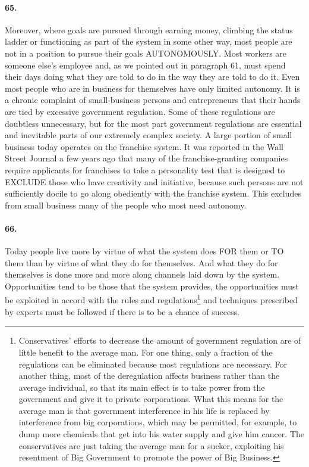 \documentclass[12pt]{book}
\begin{document}
\paragraph{65.} Moreover, where goals are pursued through earning money, climbing the status ladder or functioning as part of the system in some other way, most people are not in a position to pursue their goals AUTONOMOUSLY. Most workers are someone else's employee and, as we pointed out in paragraph 61, must spend their days doing what they are told to do in the way they are told to do it. Even most people who are in business for themselves have only limited autonomy. It is a chronic complaint of small-business persons and entrepreneurs that their hands are tied by excessive government regulation. Some of these regulations are doubtless unnecessary, but for the most part government regulations are essential and inevitable parts of our extremely complex society. A large portion of small business today operates on the franchise system. It was reported in the Wall Street Journal a few years ago that many of the franchise-granting companies require applicants for franchises to take a personality test that is designed to EXCLUDE those who have creativity and initiative, because such persons are not sufficiently docile to go along obediently with the franchise system. This excludes from small business many of the people who most need autonomy.


\paragraph{66.} Today people live more by virtue of what the system does FOR them or TO them than by virtue of what they do for themselves. And what they do for themselves is done more and more along channels laid down by the system. Opportunities tend to be those that the system provides, the opportunities must be exploited in accord with the rules and regulations\footnote{Conservatives' efforts to decrease the amount of government regulation are of little benefit to the average man. For one thing, only a fraction of the regulations can be eliminated because most regulations are necessary. For another thing, most of the deregulation affects business rather than the average individual, so that its main effect is to take power from the government and give it to private corporations. What this means for the average man is that government interference in his life is replaced by interference from big corporations, which may be permitted, for example, to dump more chemicals that get into his water supply and give him cancer. The conservatives are just taking the average man for a sucker, exploiting his resentment of Big Government to promote the power of Big Business.} and techniques prescribed by experts must be followed if there is to be a chance of success.
\end{document}
